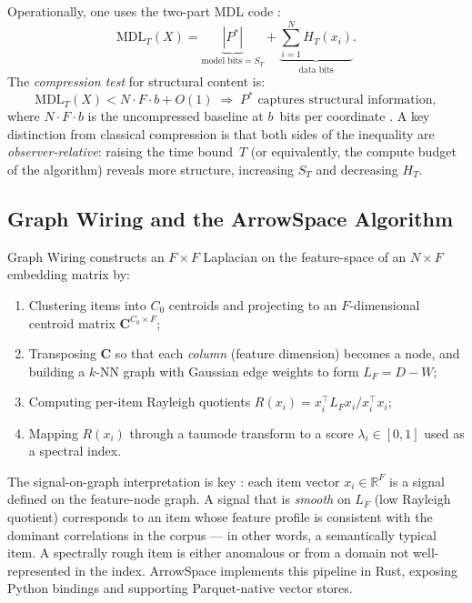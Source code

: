 \documentclass[12pt,a4paper]{article}
\theoremstyle{plain}
\theoremstyle{definition}
\theoremstyle{remark}
\newcommand{\R}{\mathbb{R}}
\newcommand{\1}{\mathbf{1}}
\begin{document}
	Operationally, one uses the two-part MDL code \citep{GrunwaldMDL,
		VitanyiMDL}:
	\begin{equation}
		\label{eq:mdl}
		\mathrm{MDL}_T(X)
		= \underbrace{|P^*|}_{\text{model bits}=S_T}
		+ \underbrace{\sum_{i=1}^{N} H_T(x_i)}_{\text{data bits}}.
	\end{equation}
	The \emph{compression test} for structural content is:
	\[
	\mathrm{MDL}_T(X) < N\cdot F\cdot b + O(1)
	\;\Longrightarrow\;
	P^*\text{ captures structural information},
	\]
	where $N\cdot F\cdot b$ is the uncompressed baseline at $b$~bits per
	coordinate \citep{VitanyiStructureFunction}.
	A key distinction from classical compression is that both sides of the
	inequality are \emph{observer-relative}: raising the time bound~$T$
	(or equivalently, the compute budget of the algorithm) reveals more
	structure, increasing $S_T$ and decreasing $H_T$.
	
	\subsection{Graph Wiring and the ArrowSpace Algorithm}
	
	Graph Wiring \citep{graphwiring2025} constructs an $F\times F$ Laplacian
	on the feature-space of an $N\times F$ embedding matrix by:
	
	\begin{enumerate}
		\item Clustering items into $C_0$ centroids and projecting to an
		$F$-dimensional centroid matrix $\mathbf{C}^{C_0\times F}$;
		\item Transposing $\mathbf{C}$ so that each \emph{column}
		(feature dimension) becomes a node, and building a $k$-NN
		graph with Gaussian edge weights to form $L_F = D - W$;
		\item Computing per-item Rayleigh quotients
		$R(x_i) = x_i^\top L_F x_i / x_i^\top x_i$;
		\item Mapping $R(x_i)$ through a taumode transform to a score
		$\lambda_i\in[0,1]$ used as a spectral index.
	\end{enumerate}
	
	The signal-on-graph interpretation is key \citep{ShumanDSPGraphs,
		SandryhailaDSPGraphs}: each item vector $x_i\in\R^F$ is a signal
	defined on the feature-node graph.
	A signal that is \emph{smooth} on $L_F$ (low Rayleigh quotient)
	corresponds to an item whose feature profile is consistent with the
	dominant correlations in the corpus --- in other words, a
	semantically typical item.
	A spectrally rough item is either anomalous or from a domain not
	well-represented in the index.
	ArrowSpace \citep{Moriondo2025ArrowSpace} implements this pipeline in
	Rust, exposing Python bindings and supporting Parquet-native vector
	stores.
	
\end{document}
